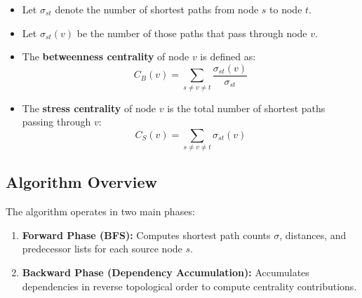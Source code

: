 \documentclass[12pt]{article}
\begin{document}
\begin{itemize}
	\item Let \( \sigma_{st} \) denote the number of shortest paths from node \( s \) to node \( t \).
	\item Let \( \sigma_{st}(v) \) be the number of those paths that pass through node \( v \).
	\item The \textbf{betweenness centrality} of node \( v \) is defined as:
	      \[
		      C_B(v) = \sum_{s \ne v \ne t} \frac{\sigma_{st}(v)}{\sigma_{st}}
	      \]
	\item The \textbf{stress centrality} of node \( v \) is the total number of shortest paths passing through \( v \):
	      \[
		      C_S(v) = \sum_{s \ne v \ne t} \sigma_{st}(v)
	      \]
\end{itemize}

\subsection*{Algorithm Overview}

The algorithm operates in two main phases:
\begin{enumerate}
	\item \textbf{Forward Phase (BFS):} Computes shortest path counts \( \sigma
	      \), distances, and predecessor lists for each source node \( s \).
	\item \textbf{Backward Phase (Dependency Accumulation):} Accumulates
	      dependencies in reverse topological order to compute centrality
	      contributions.
\end{enumerate}
\end{document}

